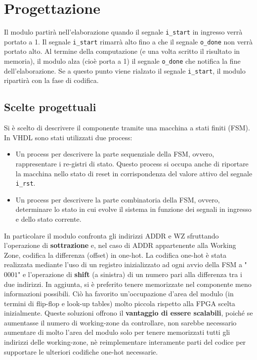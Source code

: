 \section{Progettazione}
Il modulo partirà nell'elaborazione quando il segnale {\small\lstinline[columns=fixed]{i_start}} in ingresso verrà portato a 1.\newline
Il segnale \lstinline[columns=fixed]{i_start} rimarrà alto fino a che il segnale \lstinline[columns=fixed]{o_done} non verrà portato alto. Al termine della computazione (e una volta scritto il risultato in memoria), il modulo alza (cioè porta a 1) il segnale \lstinline[columns=fixed]{o_done} che notifica la fine dell'elaborazione. Se a questo punto viene rialzato il segnale \lstinline[columns=fixed]{i_start}, il modulo ripartirà con la fase di codifica.

\subsection{Scelte progettuali}
Si è scelto di descrivere il componente tramite una macchina a stati finiti (FSM).\newline
In VHDL sono stati utilizzati due process:

\begin{itemize}
	\item Un process per descrivere la parte sequenziale della FSM, ovvero, rappresentare i re-gistri di stato. Questo process si occupa anche di riportare la macchina nello stato di reset in corrispondenza del valore attivo del segnale \lstinline[columns=fixed]{i_rst}.
	
	\item Un process per descrivere la parte combinatoria della FSM, ovvero, determinare lo stato in cui evolve il sistema in funzione dei segnali in ingresso e dello stato corrente. 
\end{itemize}

In particolare il modulo confronta gli indirizzi ADDR e WZ sfruttando l'operazione di \textbf{sottrazione} e, nel caso di ADDR appartenente alla Working Zone, codifica la differenza (offset) in one-hot.\newline
La codifica one-hot è stata realizzata mediante l'uso di un registro inizializzato ad ogni avvio della FSM a "$0001$" e l'operazione di \textbf{shift} (a sinistra) di un numero pari alla differenza tra i due indirizzi.\newline
In aggiunta, si è preferito tenere memorizzate nel componente meno informazioni possibili. Ciò ha favorito un'occupazione d'area del modulo (in termini di flip-flop e look-up tables) molto piccola rispetto alla FPGA scelta inizialmente.\newline
Queste soluzioni offrono il \textbf{vantaggio di essere scalabili}, poiché se aumentasse il numero di working-zone da controllare, non sarebbe necessario aumentare di molto l'area del modulo solo per tenere memorizzati tutti gli indirizzi delle working-zone, nè reimplementare interamente parti del codice per supportare le ulteriori codifiche one-hot necessarie.\newline

